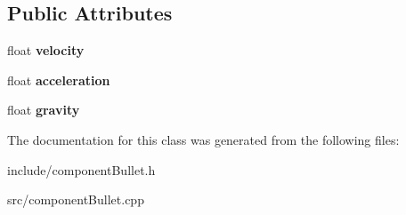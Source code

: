\subsection*{\-Public \-Attributes}
\begin{DoxyCompactItemize}
\item 
\hypertarget{classComponentTemplateBullet_af9aa226ef78a3e48874a39b40d98c615}{
float {\bfseries velocity}}
\label{d9/dc9/classComponentTemplateBullet_af9aa226ef78a3e48874a39b40d98c615}

\item 
\hypertarget{classComponentTemplateBullet_a79d5f7aaad54008a10560212c98ce7f3}{
float {\bfseries acceleration}}
\label{d9/dc9/classComponentTemplateBullet_a79d5f7aaad54008a10560212c98ce7f3}

\item 
\hypertarget{classComponentTemplateBullet_a47aba02a08d459110f638451860cda07}{
float {\bfseries gravity}}
\label{d9/dc9/classComponentTemplateBullet_a47aba02a08d459110f638451860cda07}

\end{DoxyCompactItemize}


\-The documentation for this class was generated from the following files\-:\begin{DoxyCompactItemize}
\item 
include/component\-Bullet.\-h\item 
src/component\-Bullet.\-cpp\end{DoxyCompactItemize}
